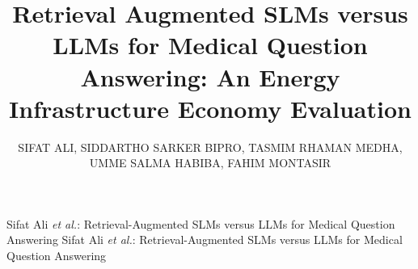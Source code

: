 \title{Retrieval Augmented SLMs versus LLMs for Medical Question Answering: An Energy Infrastructure Economy Evaluation}

\author{\uppercase{Sifat Ali}, \uppercase{Siddartho Sarker Bipro}, \uppercase{Tasmim Rhaman Medha}, \uppercase{Umme Salma Habiba}, \uppercase{Fahim Montasir}}

\address{Department of Computer Science \& Engineering, United International University, Dhaka, Bangladesh}



\markboth
{Sifat Ali \MakeLowercase{\textit{et al.}}: Retrieval-Augmented SLMs versus LLMs for Medical Question Answering}
{Sifat Ali \MakeLowercase{\textit{et al.}}: Retrieval-Augmented SLMs versus LLMs for Medical Question Answering}


